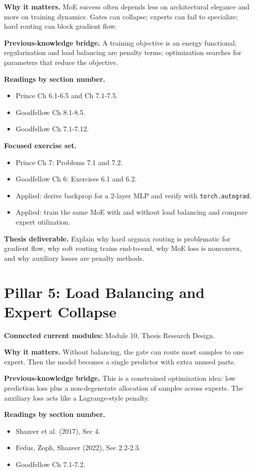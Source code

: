 \documentclass[11pt]{article}
\begin{document}
\textbf{Why it matters.} MoE success often depends less on architectural elegance and more on training dynamics. Gates can collapse; experts can fail to specialize; hard routing can block gradient flow.

\textbf{Previous-knowledge bridge.} A training objective is an energy functional; regularization and load balancing are penalty terms; optimization searches for parameters that reduce the objective.

\textbf{Readings by section number.}
\begin{itemize}
  \item Prince Ch 6.1-6.5 and Ch 7.1-7.5.
  \item Goodfellow Ch 8.1-8.5.
  \item Goodfellow Ch 7.1-7.12.
\end{itemize}

\textbf{Focused exercise set.}
\begin{itemize}
  \item Prince Ch 7: Problems 7.1 and 7.2.
  \item Goodfellow Ch 6: Exercises 6.1 and 6.2.
  \item Applied: derive backprop for a 2-layer MLP and verify with \texttt{torch.autograd}.
  \item Applied: train the same MoE with and without load balancing and compare expert utilization.
\end{itemize}

\textbf{Thesis deliverable.} Explain why hard argmax routing is problematic for gradient flow, why soft routing trains end-to-end, why MoE loss is nonconvex, and why auxiliary losses are penalty methods.

\section{Pillar 5: Load Balancing and Expert Collapse}

\textbf{Connected current modules:} Module 10, Thesis Research Design.

\textbf{Why it matters.} Without balancing, the gate can route most samples to one expert. Then the model becomes a single predictor with extra unused parts.

\textbf{Previous-knowledge bridge.} This is a constrained optimization idea: low prediction loss plus a non-degenerate allocation of samples across experts. The auxiliary loss acts like a Lagrange-style penalty.

\textbf{Readings by section number.}
\begin{itemize}
  \item Shazeer et al. (2017), Sec 4.
  \item Fedus, Zoph, Shazeer (2022), Sec 2.2-2.3.
  \item Goodfellow Ch 7.1-7.2.
\end{itemize}
\end{document}
